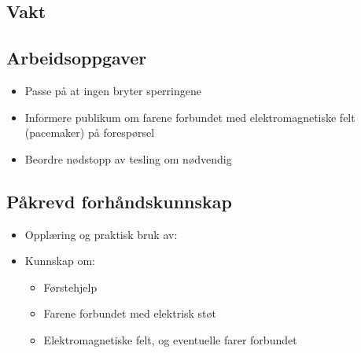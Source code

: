\subsection{Vakt}

\subsection*{Arbeidsoppgaver}
\begin{itemize}
\item{Passe på at ingen bryter sperringene}
\item{Informere publikum om farene forbundet med elektromagnetiske felt (pacemaker) på forespørsel}
\item{Beordre nødstopp av tesling om nødvendig}
\end{itemize}


\subsection*{Påkrevd forhåndskunnskap}
\begin{itemize}
\item{Opplæring og praktisk bruk av:}
\iftoggle{INTERN}{
    \begin{itemize}
    \item{Roping}
    \end{itemize}
}{
}
\item{Kunnskap om:}
\begin{itemize}
\item{Førstehjelp}
\item{Farene forbundet med elektrisk støt}
\item{Elektromagnetiske felt, og eventuelle farer forbundet}
\end{itemize}
\end{itemize}